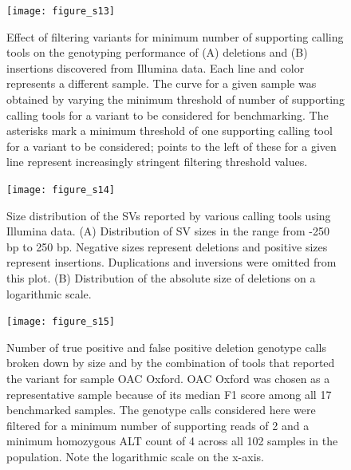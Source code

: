 \documentclass[12pt]{article}
\newenvironment{cfigure}
	{\begin{figure} \centering}
	{\end{figure}}
\newenvironment{lsfigure}
	{\begin{landscape} \begin{figure} \centering}
	{\end{figure} \end{landscape}}
\begin{document}
\begin{cfigure}
	\texttt{[image: figure\_s13]}

	\caption[Effect of the number of supporting calling tools on genotyping performance of Illumina deletions and insertions]{
		Effect of filtering variants for minimum number of supporting calling tools on the genotyping performance of (A) deletions and (B) insertions discovered from Illumina data.
		Each line and color represents a different sample.
		The curve for a given sample was obtained by varying the minimum threshold of number of supporting calling tools for a variant to be considered for benchmarking.
		The asterisks mark a minimum threshold of one supporting calling tool for a variant to be considered; points to the left of these for a given line represent increasingly stringent filtering threshold values.
		}

	\label{fig_s13}

\end{cfigure}

\clearpage%

\begin{cfigure}
	\texttt{[image: figure\_s14]}

	\caption[Size distribution of the SVs reported by various calling tools using Illumina data]{
		Size distribution of the SVs reported by various calling tools using Illumina data.
		(A) Distribution of SV sizes in the range from -250 bp to 250 bp.
		Negative sizes represent deletions and positive sizes represent insertions.
		Duplications and inversions were omitted from this plot.
		(B) Distribution of the absolute size of deletions on a logarithmic scale.
	}

	\label{fig_s14}

\end{cfigure}

\clearpage%

\begin{lsfigure}
	\texttt{[image: figure\_s15]}

	\caption[Number of true positive and false positive deletion calls reported by various calling tool combinations]{
		Number of true positive and false positive deletion genotype calls broken down by size and by the combination of tools that reported the variant for sample OAC Oxford.
		OAC Oxford was chosen as a representative sample because of its median F1 score among all 17 benchmarked samples.
		The genotype calls considered here were filtered for a minimum number of supporting reads of 2 and a minimum homozygous ALT count of 4 across all 102 samples in the population.
		Note the logarithmic scale on the x-axis.
	}

	\label{fig_s15}

\end{lsfigure}
\end{document}
